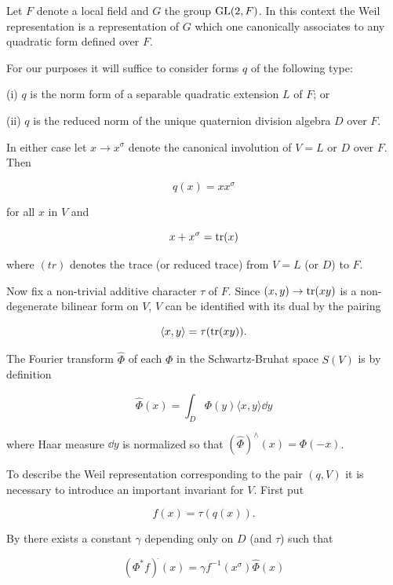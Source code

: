 Let $F$ denote a local field and $G$ the group $\operatorname{GL}(2,F)$. In this context the Weil representation is a representation of $G$ which one canonically associates to any quadratic form defined over $F$.

For our purposes it will suffice to consider forms $q$ of the following type:

(i) $q$ is the norm form of a separable quadratic extension $L$ of $F$; or

(ii) $q$ is the reduced norm of the unique quaternion division algebra $D$ over $F$.

In either case let $x \to x^{\sigma}$ denote the canonical involution of $V = L$ or $D$ over $F$. Then

\[
q(x) = xx^{\sigma}
\]

for all $x$ in $V$ and

\[
x + x^{\sigma} = \operatorname{tr}(x)
\]

where $(tr)$ denotes the trace (or reduced trace) from $V = L$ (or $D$) to $F$.

Now fix a non-trivial additive character $\tau$ of $F$. Since $(x,y) \to \operatorname{tr}(xy)$ is a non-degenerate bilinear form on $V$, $V$ can be identified with its dual by the pairing

\[
\langle x, y \rangle = \tau(\operatorname{tr}(xy)).
\]

The Fourier transform $\hat{\Phi}$ of each $\Phi$ in the Schwartz-Bruhat space $S(V)$ is by definition

\begin{equation}\label{eq:7.1}
\hat{\Phi}(x) = \int_{D} \Phi(y) \langle x, y \rangle \dd y\tag{7.1}
\end{equation}

where Haar measure $\dd y$ is normalized so that $(\hat{\Phi})^{\wedge}(x) = \Phi(-x)$.

To describe the Weil representation corresponding to the pair $(q,V)$ it is necessary to introduce an important invariant for $V$. First put

\begin{equation}\label{eq:7.2}
f(x) = \tau(q(x)).\tag{7.2}
\end{equation}

By \cite{Weil3} there exists a constant $\gamma$ depending only on $D$ (and $\tau$) such that

\begin{equation}\label{eq:7.3}
(\Phi^{*}f)^{\hat{}}(x) = \gamma f^{-1}(x^{\sigma})\hat{\Phi}(x)\tag{7.3}
\end{equation}

